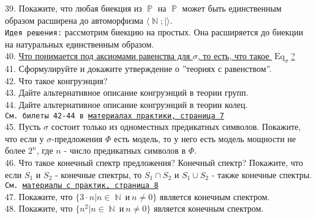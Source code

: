 \documentclass[a4paper,100pt]{article}
\theoremstyle{indented}
\theoremstyle{definition}
\theoremstyle{remark}
\DeclareMathOperator{\NN}{\mathbb{N}}
\DeclareMathOperator{\PP}{\mathbb{P}}
\DeclareMathOperator{\Eq}{Eq}
\begin{document}
39. %
{Покажите, что любая биекция из $\PP$ на $\PP$ может быть единственным образом расширена до автоморфизма $\langle \NN; | \rangle$.} \\

\texttt{Идея решения:} рассмотрим биекцию на простых. Она расширяется до биекции на натуральных единственным образом. \\

40. \hyperlink{b40}{Что понимается под аксиомами равенства для $\sigma$, то есть, что такое $\Eq_\sigma$?} \\ 

41. %
{Сформулируйте и докажите утверждение о ''теориях с равенством''.} \\ 

42. %
{Что такое конгруэнция?} \\ 

43. %
{Дайте альтернативное описание конгруэнций в теории групп.} \\ 

44. %
{Дайте альтернативное описание конгруэнций в теории колец.} \\ 

\texttt{См. билеты 42-44 в \href{http://www.mi-ras.ru/~speranski/courses/logic-1-2021-spring/exercises.pdf}{материалах практики, страница 7}} \\ 

45. %
{Пусть $\sigma$ состоит только из одноместных предикатных символов. Покажите, что если у $\sigma$-предложения $\Phi$ есть модель, то у него есть модель мощности не более $2^n$, где $n$ - число предикатных символов в $\Phi$.} \\ 

46. %
{Что такое конечный спектр предложения? Конечный спектр? Покажите, что если $S_1$ и $S_2$ - конечные спектры, то $S_1 \cap S_2$ и $S_1 \cup S_2$ - также конечные спектры.} \\ 

\texttt{См. \href{http://www.mi-ras.ru/~speranski/courses/logic-1-2021-spring/exercises.pdf}{материалы с практик, страница 8}} \\ 

47. %
{Покажите, что $\{3 \cdot n | n \in \NN \: и \: n \neq 0\}$ является конечным спектром.} \\

48. %
{Покажите, что $\{n^2 | n \in \NN \: и \: n \neq 0\}$ является конечным спектром.} \\
\end{document}
